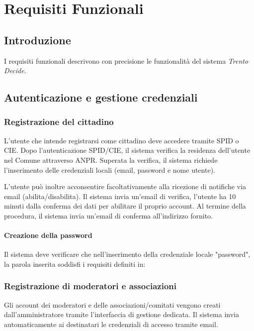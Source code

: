 \chapter{Requisiti Funzionali}

\setlength{\parskip}{0.4em}
\setlength{\parindent}{0pt}

\section{Introduzione}
I requisiti funzionali descrivono con precisione le funzionalità del sistema \emph{Trento Decide}. 


\begin{rfscope}

\section{Autenticazione e gestione credenziali} \label{rf:autecred}

\subsection{Registrazione del cittadino} \label{rf:registrazionecittadini}
L’utente che intende registrarsi come cittadino deve accedere tramite SPID o CIE\@.
Dopo l’autenticazione SPID/CIE, il sistema verifica la residenza dell’utente nel Comune attraverso ANPR\@.  
Superata la verifica, il sistema richiede l’inserimento delle credenziali locali (email, password e nome utente).

L’utente può inoltre acconsentire facoltativamente alla ricezione di notifiche via email (abilita/disabilita).
Il sistema invia un'email di verifica, l'utente ha 10 minuti dalla conferma dei dati per abilitare il proprio account.
Al termine della procedura, il sistema invia un’email di conferma all’indirizzo fornito.

\subsubsection{Creazione della password} \label{rf:credenziali}
Il sistema deve verificare che nell'inserimento della credenziale locale "password", la parola inserita soddisfi i requisiti definiti in: 

\subsection{Registrazione di moderatori e associazioni} \label{rf:registrazionemodass}
Gli account dei moderatori e delle associazioni/comitati vengono creati dall’amministratore tramite l’interfaccia di gestione dedicata.
Il sistema invia automaticamente ai destinatari le credenziali di accesso tramite email.


\end{rfscope}
